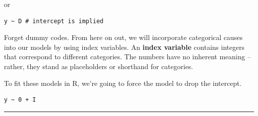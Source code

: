 \documentclass[
  letterpaper,
  DIV=11,
  numbers=noendperiod]{scrartcl}
\newenvironment{Shaded}{\begin{snugshade}}{\end{snugshade}}
\newcommand{\AttributeTok}[1]{\textcolor[rgb]{0.40,0.45,0.13}{#1}}
\newcommand{\CommentTok}[1]{\textcolor[rgb]{0.37,0.37,0.37}{#1}}
\newcommand{\DecValTok}[1]{\textcolor[rgb]{0.68,0.00,0.00}{#1}}
\newcommand{\FunctionTok}[1]{\textcolor[rgb]{0.28,0.35,0.67}{#1}}
\newcommand{\NormalTok}[1]{\textcolor[rgb]{0.00,0.23,0.31}{#1}}
\newcommand{\OtherTok}[1]{\textcolor[rgb]{0.00,0.23,0.31}{#1}}
\newcommand{\SpecialCharTok}[1]{\textcolor[rgb]{0.37,0.37,0.37}{#1}}
\newcommand{\StringTok}[1]{\textcolor[rgb]{0.13,0.47,0.30}{#1}}
\begin{document}
or

\begin{verbatim}
y ~ D # intercept is implied
\end{verbatim}

Forget dummy codes. From here on out, we will incorporate categorical
causes into our models by using index variables. An \textbf{index
variable} contains integers that correspond to different categories. The
numbers have no inherent meaning -- rather, they stand as placeholders
or shorthand for categories.

To fit these models in R, we're going to force the model to drop the
intercept.

\begin{verbatim}
y ~ 0 + I
\end{verbatim}

\begin{center}\rule{0.5\linewidth}{0.5pt}\end{center}

\begin{Shaded}
\end{Shaded}
\end{document}
